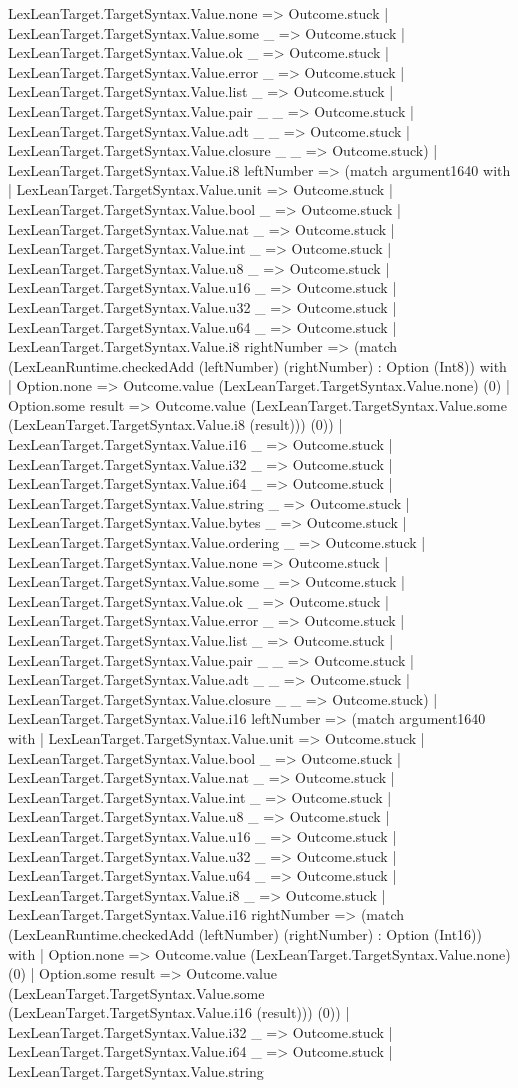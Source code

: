\documentclass[11pt]{article}
\begin{document}
LexLeanTarget.TargetSyntax.Value.none => Outcome.stuck | LexLeanTarget.TargetSyntax.Value.some \_ => Outcome.stuck | LexLeanTarget.TargetSyntax.Value.ok \_ => Outcome.stuck | LexLeanTarget.TargetSyntax.Value.error \_ => Outcome.stuck | LexLeanTarget.TargetSyntax.Value.list \_ => Outcome.stuck | LexLeanTarget.TargetSyntax.Value.pair \_ \_ => Outcome.stuck | LexLeanTarget.TargetSyntax.Value.adt \_ \_ => Outcome.stuck | LexLeanTarget.TargetSyntax.Value.closure \_ \_ => Outcome.stuck) | LexLeanTarget.TargetSyntax.Value.i8 leftNumber => (match argument1640 with | LexLeanTarget.TargetSyntax.Value.unit => Outcome.stuck | LexLeanTarget.TargetSyntax.Value.bool \_ => Outcome.stuck | LexLeanTarget.TargetSyntax.Value.nat \_ => Outcome.stuck | LexLeanTarget.TargetSyntax.Value.int \_ => Outcome.stuck | LexLeanTarget.TargetSyntax.Value.u8 \_ => Outcome.stuck | LexLeanTarget.TargetSyntax.Value.u16 \_ => Outcome.stuck | LexLeanTarget.TargetSyntax.Value.u32 \_ => Outcome.stuck | LexLeanTarget.TargetSyntax.Value.u64 \_ => Outcome.stuck | LexLeanTarget.TargetSyntax.Value.i8 rightNumber => (match (LexLeanRuntime.checkedAdd (leftNumber) (rightNumber) : Option (Int8)) with | Option.none => Outcome.value (LexLeanTarget.TargetSyntax.Value.none) (0) | Option.some result => Outcome.value (LexLeanTarget.TargetSyntax.Value.some (LexLeanTarget.TargetSyntax.Value.i8 (result))) (0)) | LexLeanTarget.TargetSyntax.Value.i16 \_ => Outcome.stuck | LexLeanTarget.TargetSyntax.Value.i32 \_ => Outcome.stuck | LexLeanTarget.TargetSyntax.Value.i64 \_ => Outcome.stuck | LexLeanTarget.TargetSyntax.Value.string \_ => Outcome.stuck | LexLeanTarget.TargetSyntax.Value.bytes \_ => Outcome.stuck | LexLeanTarget.TargetSyntax.Value.ordering \_ => Outcome.stuck | LexLeanTarget.TargetSyntax.Value.none => Outcome.stuck | LexLeanTarget.TargetSyntax.Value.some \_ => Outcome.stuck | LexLeanTarget.TargetSyntax.Value.ok \_ => Outcome.stuck | LexLeanTarget.TargetSyntax.Value.error \_ => Outcome.stuck | LexLeanTarget.TargetSyntax.Value.list \_ => Outcome.stuck | LexLeanTarget.TargetSyntax.Value.pair \_ \_ => Outcome.stuck | LexLeanTarget.TargetSyntax.Value.adt \_ \_ => Outcome.stuck | LexLeanTarget.TargetSyntax.Value.closure \_ \_ => Outcome.stuck) | LexLeanTarget.TargetSyntax.Value.i16 leftNumber => (match argument1640 with | LexLeanTarget.TargetSyntax.Value.unit => Outcome.stuck | LexLeanTarget.TargetSyntax.Value.bool \_ => Outcome.stuck | LexLeanTarget.TargetSyntax.Value.nat \_ => Outcome.stuck | LexLeanTarget.TargetSyntax.Value.int \_ => Outcome.stuck | LexLeanTarget.TargetSyntax.Value.u8 \_ => Outcome.stuck | LexLeanTarget.TargetSyntax.Value.u16 \_ => Outcome.stuck | LexLeanTarget.TargetSyntax.Value.u32 \_ => Outcome.stuck | LexLeanTarget.TargetSyntax.Value.u64 \_ => Outcome.stuck | LexLeanTarget.TargetSyntax.Value.i8 \_ => Outcome.stuck | LexLeanTarget.TargetSyntax.Value.i16 rightNumber => (match (LexLeanRuntime.checkedAdd (leftNumber) (rightNumber) : Option (Int16)) with | Option.none => Outcome.value (LexLeanTarget.TargetSyntax.Value.none) (0) | Option.some result => Outcome.value (LexLeanTarget.TargetSyntax.Value.some (LexLeanTarget.TargetSyntax.Value.i16 (result))) (0)) | LexLeanTarget.TargetSyntax.Value.i32 \_ => Outcome.stuck | LexLeanTarget.TargetSyntax.Value.i64 \_ => Outcome.stuck | LexLeanTarget.TargetSyntax.Value.string 
\end{document}
